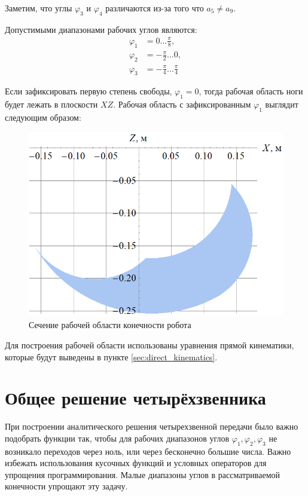 Заметим, что углы $ \varphi_3 $ и $ \varphi_4 $ различаются из-за того что $ a_5 \neq a_9 $. 

Допустимыми диапазонами рабочих углов являются:
\begin{align*}
    \varphi_1&=0 \dots \frac \pi 8, \\
    \varphi_2&=-\frac \pi 2 \dots 0 ,\\
    \varphi_3&=-\frac \pi 4 \dots \frac \pi 4
\end{align*}

Если зафиксировать первую степень свободы, $ \varphi_1 = 0 $, тогда рабочая область ноги будет лежать в плоскости $ XZ $. Рабочая область с зафиксированным $ \varphi_1 $ выглядит следующим образом:
\begin{figure}[h]
    \centering
    \includegraphics[scale=0.5]{chapter_kinematics/figure3.png}
    \caption{Сечение рабочей области конечности робота}
    \label{}
\end{figure}

Для построения рабочей области использованы уравнения прямой кинематики, которые будут выведены в пункте \ref{sec:direct_kinematics}.

\section{Общее решение четырёхзвенника} \label{sec:pre_direct_kin}

При построении аналитического решения четырехзвенной передачи было важно подобрать функции так, чтобы для рабочих диапазонов углов $ \varphi_1, \varphi_2, \varphi_3 $ не возникало переходов через ноль, или через бесконечно большие числа. Важно избежать использования кусочных функций и условных операторов для упрощения программирования.
Малые диапазоны углов в рассматриваемой конечности упрощают эту задачу.

